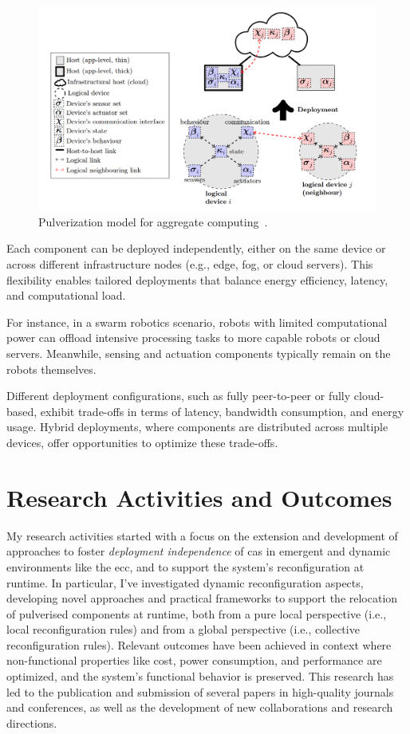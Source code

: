 \documentclass[runningheads]{llncs}
\begin{document}
\begin{figure}[t]
    \centering
    \includegraphics[width=\textwidth]{figures/image.png}
    \caption{Pulverization model for aggregate computing~\cite{DBLP:journals/fi/CasadeiPPVW20}.}
    \label{fig:pulverization-model}
\end{figure}

Each component can be deployed independently,
either on the same device or across different infrastructure nodes (e.g., edge, fog, or cloud servers).
%
This flexibility enables tailored deployments that balance energy efficiency,
latency,
and computational load.

For instance,
in a swarm robotics scenario,
robots with limited computational power can offload intensive processing tasks to more capable robots or cloud servers.
%
Meanwhile,
sensing and actuation components typically remain on the robots themselves.

Different deployment configurations,
such as fully peer-to-peer or fully cloud-based,
exhibit trade-offs in terms of latency, bandwidth consumption,
and energy usage.
%
Hybrid deployments,
where components are distributed across multiple devices,
offer opportunities to optimize these trade-offs.

\section{Research Activities and Outcomes}
\label{sec:research-activities}

My research activities started with a focus on the extension and development of approaches to foster \emph{deployment independence} of \ac{cas} in emergent and dynamic environments like the \ac{ecc},
and to support the system's reconfiguration at runtime.
%
In particular,
I've investigated dynamic reconfiguration aspects,
developing novel approaches and practical frameworks to support the relocation of pulverised components at runtime,
both from a pure local perspective (i.e., local reconfiguration rules) and from a global perspective (i.e., collective reconfiguration rules).
%
Relevant outcomes have been achieved in context where non-functional properties like cost,
power consumption,
and performance are optimized,
and the system's functional behavior is preserved.
%
This research has led to the publication and submission of several papers in high-quality journals and conferences,
as well as the development of new collaborations and research directions.
\end{document}
